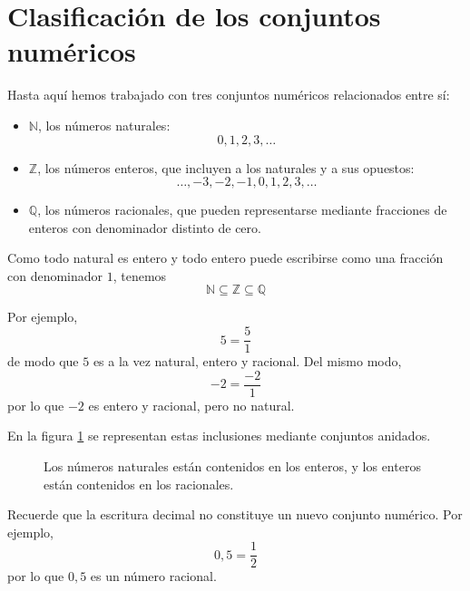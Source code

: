 \section{Clasificación de los conjuntos numéricos}

Hasta aquí hemos trabajado con tres conjuntos numéricos relacionados entre sí:
\begin{itemize}
    \item \(\mathbb{N}\), los números naturales:
    \[
    0,1,2,3,\ldots
    \]
    \item \(\mathbb{Z}\), los números enteros, que incluyen a los naturales y a sus opuestos:
    \[
    \ldots,-3,-2,-1,0,1,2,3,\ldots
    \]
    \item \(\mathbb{Q}\), los números racionales, que pueden representarse mediante fracciones de enteros con denominador distinto de cero.
\end{itemize}

Como todo natural es entero y todo entero puede escribirse como una fracción con denominador \(1\), tenemos
\[
\boxed{\mathbb{N}\subseteq\mathbb{Z}\subseteq\mathbb{Q}}
\]

Por ejemplo,
\[
5=\frac51
\]
de modo que \(5\) es a la vez natural, entero y racional. Del mismo modo,
\[
-2=\frac{-2}{1}
\]
por lo que \(-2\) es entero y racional, pero no natural.

En la figura \ref{fig:jerarquia_numeros} se representan estas inclusiones mediante conjuntos anidados.

\begin{figure}[!ht]
  \centering
  \caption{Los números naturales están contenidos en los enteros, y los enteros están contenidos en los racionales.}
  \label{fig:jerarquia_numeros}
\end{figure}

Recuerde que la escritura decimal no constituye un nuevo conjunto numérico. Por ejemplo,
\[
0{,}5=\frac12
\]
por lo que \(0{,}5\) es un número racional.


